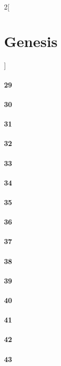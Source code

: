 \documentclass{book}
\begin{document}
\begin{multicols}{2}[\part{Genesis}]
\subsection*{29}
\subsection*{30}
\subsection*{31}
\subsection*{32}
\subsection*{33}
\subsection*{34}
\subsection*{35}
\subsection*{36}
\subsection*{37}
\subsection*{38}
\subsection*{39}
\subsection*{40}
\subsection*{41}
\subsection*{42}
\subsection*{43}

\end{multicols}
\end{document}
